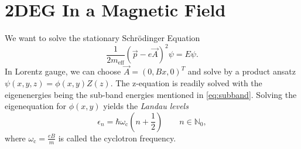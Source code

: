 \section{2DEG In a Magnetic Field}
We want to solve the stationary Schrödinger Equation
\begin{equation*}
	\frac{1}{2m_\text{eff}}\left(\vec{p}-e\vec{A}\right)^2\psi = E\psi.
\end{equation*}
In Lorentz gauge, we can choose $\vec{A}=(0, Bx, 0)^T$ and solve by a product ansatz $\psi(x,y,z) = \phi(x,y)Z(z)$.
The z-equation is readily solved with the eigenenergies being the sub-band energies mentioned in \autoref{eq:subband}.
Solving the eigenequation for $\phi(x,y)$ yields the \textit{Landau levels}
\begin{equation*}
	\epsilon_n = \hbar\omega_\text{c}\left(n+\frac{1}{2}\right)\qquad{n\in\mathbb{N}_0},
\end{equation*}
where $\omega_\text{c} = \frac{eB}{m}$ is called the cyclotron frequency.

